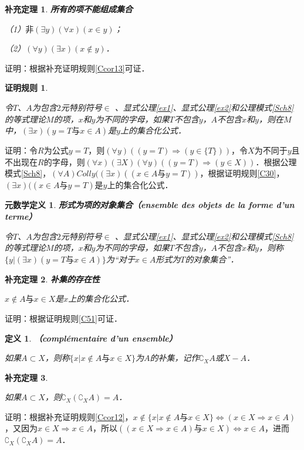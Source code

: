 \documentclass[12pt, a4paper, oneside]{book}
\newtheorem{metadef}{元数学定义}
\newtheorem{C}{证明规则}
\newtheorem{cor}{补充定理}
\newtheorem{de}{定义}
\begin{document}
			\begin{cor}\label{cor10}
				\textbf{所有的项不能组成集合}
				\par
				（1）$\text{非}(\exists y)(\forall x)(x\in y)$；
				\par
				（2）$(\forall y)(\exists x)(x\notin y)$．
			\end{cor}
			证明：根据补充证明规则\ref{Ccor13}可证．

			\begin{C}\label{C53}
				\hfill\par
				令$T$、$A$为包含$2$元特别符号$\in$ 、显式公理\ref{ex1}、显式公理\ref{ex2}和公理模式\ref{Sch8}的等式理论$M$的项，$x$和$y$为不同的字母，如果$T$不包含$y$，$A$不包含$x$和$y$，则在$M$中，$(\exists x)(y=T\text{与}x\in A)$是$y$上的集合化公式．
			\end{C}
			证明：令$R$为公式$y=T$，则$(\forall y)((y=T)\Rightarrow (y\in \{T\}))$，令$X$为不同于$y$且不出现在$R$的字母，则$(\forall x)(\exists X)(\forall y)((y=T)\Rightarrow (y\in X))$．根据公理模式\ref{Sch8}，$(\forall A)Colly((\exists x)((x\in A\text{与}y=T))$，根据证明规则\ref{C30}，$(\exists x)((x\in A\text{与}y=T)$是$y$上的集合化公式．

			\begin{metadef}
				\textbf{形式为项的对象集合（ensemble des objets de la forme d'un terme）}
				\par
				令$T$、$A$为包含$2$元特别符号$\in$ 、显式公理\ref{ex1}、显式公理\ref{ex2}和公理模式\ref{Sch8}的等式理论$M$的项，$x$和$y$为不同的字母，如果$T$不包含$y$，$A$不包含$x$和$y$，则称$\{y|(\exists x)(y=T\text{与}x\in A)\}$为“对于$x\in A$形式为$T$的对象集合”．
			\end{metadef}

			\begin{cor}\label{cor11}
				\textbf{补集的存在性}				
				\par
				$x\notin A\text{与}x\in X$是$x$上的集合化公式．
			\end{cor}
			证明：根据证明规则\ref{C51}可证．

			\begin{de}
				\textbf{（complémentaire d'un ensemble）}
				\par
				如果$A\subset X$，则称$\{x|x\notin A\text{与}x\in X\}$为$A$的补集，记作$\complement_XA$或$X-A$．
			\end{de}

			\begin{cor}\label{cor12}
				\hfill\par
				如果$A\subset X$，则$\complement_X(\complement_XA)=A$．
			\end{cor}
			证明：根据补充证明规则\ref{Ccor12}，$x\notin \{x|x\notin A\text{与}x\in X\}\Leftrightarrow (x\in X\Rightarrow x\in A)$，又因为$x\in X\Rightarrow x\in A$，所以$((x\in X\Rightarrow x\in A)\text{与}x\in X)\Leftrightarrow x\in A$，进而$\complement_X(\complement_XA)=A$．
\end{document}
